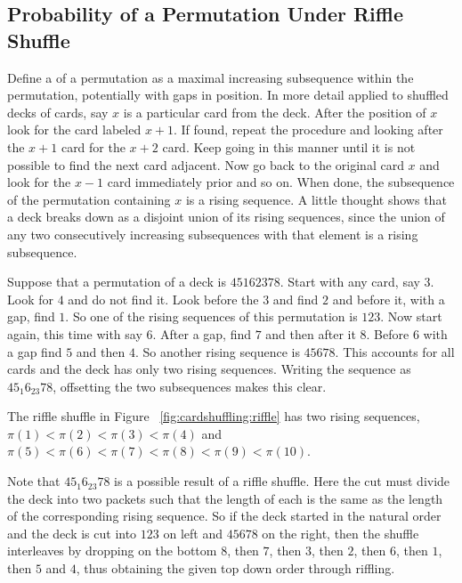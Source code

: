 \documentclass[12pt]{article}
\begin{document}
\subsection*{Probability of a Permutation Under Riffle Shuffle}

Define a %
of a permutation as a maximal increasing subsequence within the
permutation, potentially with gaps in position.  In more detail applied
to shuffled decks of cards, say \( x \) is a particular card from the
deck.  After the position of \( x \) look for the card labeled \( x+1 \).
If found, repeat the procedure and looking after the \( x+1 \) card for
the \( x+2 \) card.  Keep going in this manner until it is not possible
to find the next card adjacent.  Now go back to the original card \( x \)
and look for the \( x-1 \) card immediately prior and so on.  When done,
the subsequence of the permutation containing \( x \) is a rising
sequence.  A little thought shows that a deck breaks down as a disjoint
union of its rising sequences, since the union of any two consecutively
increasing subsequences with that element is a rising subsequence.

\begin{example}
    Suppose that a permutation of a deck is \( 45162378 \).  Start with
    any card, say \( 3 \).  Look for \( 4 \) and do not find it.  Look
    before the \( 3 \) and find \( 2 \) and before it, with a gap, find \(
    1 \).  So one of the rising sequences of this permutation is \( 123 \).
    Now start again, this time with say \( 6 \).  After a gap, find \( 7
    \) and then after it \( 8 \).  Before \( 6 \) with a gap find \( 5 \)
    and then \( 4 \).  So another rising sequence is \( 45678 \).  This
    accounts for all cards and the deck has only two rising sequences.
    Writing the sequence as \( 45_{1}6_{23}78 \), offsetting the two
    subsequences makes this clear.
\end{example}

\begin{example}
    The riffle shuffle in Figure~%
    \ref{fig:cardshuffling:riffle} has two rising sequences, \( \pi(1) <
    \pi(2) < \pi(3) < \pi(4) \) and \( \pi(5) < \pi(6) < \pi(7) < \pi(8)
    < \pi(9) < \pi(10) \).
\end{example}

\begin{example}
    Note that \( 45_{1}6_{23}78 \) is a possible result of a riffle
    shuffle.  Here the cut must divide the deck into two packets such
    that the length of each is the same as the length of the
    corresponding rising sequence.  So if the deck started in the
    natural order and the deck is cut into \( 123 \) on left and \(
    45678 \) on the right, then the shuffle interleaves by dropping on
    the bottom \( 8 \), then \( 7 \), then \( 3 \), then \( 2 \), then \(
    6 \), then \( 1 \), then \( 5 \) and \( 4 \), thus obtaining the
    given top down order through riffling.
\end{example}
\end{document}
